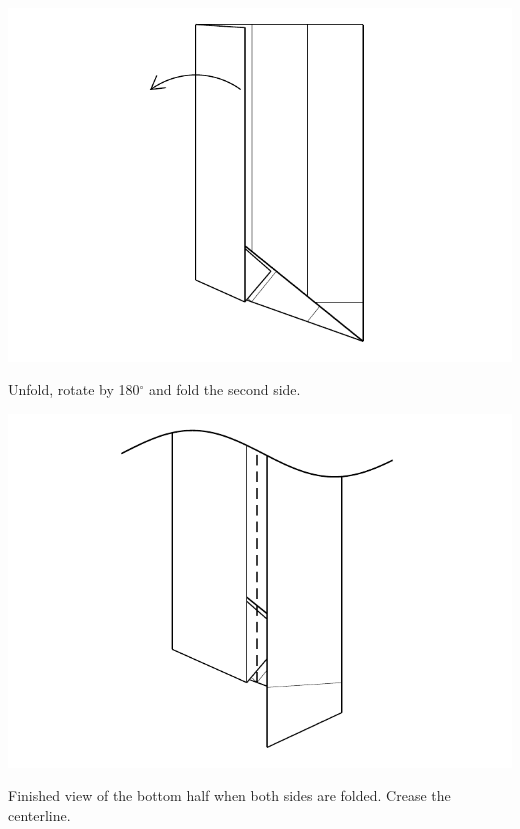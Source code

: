 \documentclass[11pt]{article}
\begin{document}
\begin{minipage}[t]{0.3\textwidth}
  \includegraphics[width=\textwidth]{../figs/fig10-07}
  \begin{itemize}{\item[7.] Unfold, rotate by 180$^\circ$ and fold the second side.}\end{itemize}
\end{minipage}
\begin{minipage}[t]{0.3\textwidth}
  \includegraphics[width=\textwidth]{../figs/fig10-08}
  \begin{itemize}{\item[8.] Finished view of the bottom half when both sides are folded.  Crease the centerline.}\end{itemize}
\end{minipage}
\end{document}
